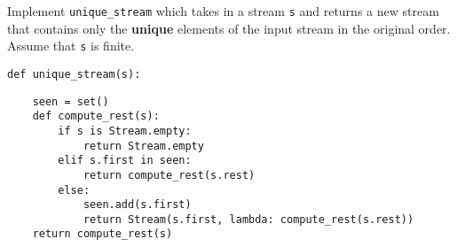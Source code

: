 \begin{blocksection}
\question Implement \lstinline$unique_stream$ which takes in a stream
\lstinline$s$ and returns a new stream that contains only the \textbf{unique}
elements of the input stream in the original order. Assume that \lstinline$s$ is
finite.

\begin{lstlisting}
def unique_stream(s):
\end{lstlisting}

\begin{solution}[2in]
\begin{lstlisting}
    seen = set()
    def compute_rest(s):
        if s is Stream.empty:
            return Stream.empty
        elif s.first in seen:
            return compute_rest(s.rest)
        else:
            seen.add(s.first)
            return Stream(s.first, lambda: compute_rest(s.rest))
    return compute_rest(s)
\end{lstlisting}
\end{solution}
\end{blocksection}
